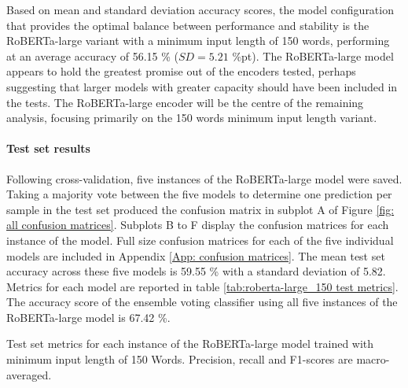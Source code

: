 \documentclass[12pt]{report}
\begin{document}
Based on mean and standard deviation accuracy scores, the model configuration that provides the optimal balance between performance and stability is the RoBERTa-large variant with a minimum input length of 150 words, performing at an average accuracy of 56.15 \% ($SD=5.21$ \%pt).
The RoBERTa-large model appears to hold the greatest promise out of the encoders tested, perhaps suggesting that larger models with greater capacity should have been included in the tests.
The RoBERTa-large encoder will be the centre of the remaining analysis, focusing primarily on the 150 words minimum input length variant.

\paragraph*{Test set results}
Following cross-validation, five instances of the RoBERTa-large model were saved.
Taking a majority vote between the five models to determine one prediction per sample in the test set produced the confusion matrix in subplot A of Figure \ref{fig: all confusion matrices}.
Subplots B to F display the confusion matrices for each instance of the model.
Full size confusion matrices for each of the five individual models are included in Appendix \ref{App: confusion matrices}.
The mean test set accuracy across these five models is 59.55 \% with a standard deviation of 5.82.
Metrics for each model are reported in table \ref{tab:roberta-large_150 test metrics}.
The accuracy score of the ensemble voting classifier using all five instances of the RoBERTa-large model is 67.42 \%.

\begin{table}
    \begin{adjustbox}{width=1\textwidth}
        
    \end{adjustbox}
    \caption{Test set metrics for each instance of the RoBERTa-large model trained with minimum input length of 150 Words. Precision, recall and F1-scores are macro-averaged.}
    \label{tab:roberta-large_150 test metrics}
\end{table}
\end{document}

